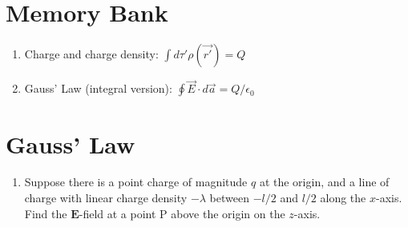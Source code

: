 \documentclass[12pt]{article}
\begin{document}
\maketitle

\section{Memory Bank}

\begin{enumerate}
\item Charge and charge density: $\int d\tau' \rho(\vec{r'}) = Q$
\item Gauss' Law (integral version): $\oint \vec{E} \cdot d\vec{a} = Q/\epsilon_0$
\end{enumerate}

\section{Gauss' Law}

\begin{enumerate}
\item Suppose there is a point charge of magnitude $q$ at the origin, and a line of charge with linear charge density $-\lambda$ between $-l/2$ and $l/2$ along the $x$-axis.  Find the $\mathbf{E}$-field at a point P above the origin on the $z$-axis.
\end{enumerate}
\end{document}
